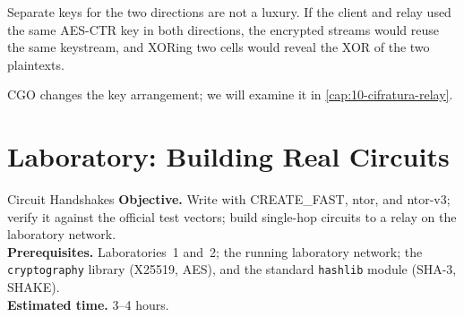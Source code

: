 Separate keys for the two directions are not a luxury. If the client and relay used the same AES-CTR key in both directions, the encrypted streams would reuse the same keystream, and XORing two cells would reveal the XOR of the two plaintexts.

CGO changes the key arrangement; we will examine it in \cref{cap:10-cifratura-relay}.

\section{Laboratory: Building Real Circuits}\label{sec:lab-circuiti}

\begin{laboratorio}[3]{Circuit Handshakes}
\textbf{Objective.} Write  with CREATE\_FAST, ntor, and ntor-v3; verify it against the official test vectors; build single-hop circuits to a relay on the laboratory network.\\
\textbf{Prerequisites.} Laboratories~1 and~2; the running laboratory network; the \texttt{cryptography} library (X25519, AES), and the standard \texttt{hashlib} module (SHA-3, SHAKE).\\
\textbf{Estimated time.} 3--4 hours.
\end{laboratorio}

